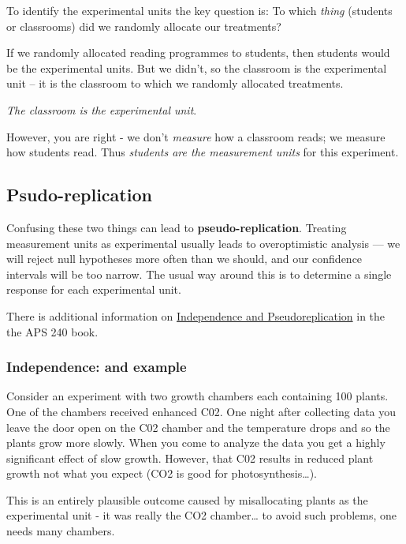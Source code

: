 \documentclass[
]{book}
\begin{document}
To identify the experimental units the key question is: To which \emph{thing} (students or classrooms) did we randomly allocate our treatments?

If we randomly allocated reading programmes to students, then students would be the experimental units. But we didn't, so the classroom is the experimental unit -- it is the classroom to which we randomly allocated treatments.

\emph{The classroom is the experimental unit}.

However, you are right - we don't \emph{measure} how a classroom reads; we measure how students read. Thus \emph{students are the measurement units} for this experiment.

\hypertarget{psudo-replication}{%
\subsection{Psudo-replication}\label{psudo-replication}}

Confusing these two things can lead to \textbf{pseudo-replication}. Treating measurement units as experimental usually leads to overoptimistic analysis --- we will reject null hypotheses more often than we should, and our confidence intervals will be too narrow. The usual way around this is to determine a single response for each experimental unit.

There is additional information on \href{https://dzchilds.github.io/stats-for-bio/principles-experimental-design.html\#independence}{Independence and Pseudoreplication} in the the APS 240 book.

\hypertarget{independence-and-example}{%
\subsubsection{Independence: and example}\label{independence-and-example}}

Consider an experiment with two growth chambers each containing 100 plants. One of the chambers received enhanced C02. One night after collecting data you leave the door open on the C02 chamber and the temperature drops and so the plants grow more slowly. When you come to analyze the data you get a highly significant effect of slow growth. However, that C02 results in reduced plant growth not what you expect (CO2 is good for photosynthesis\ldots).

This is an entirely plausible outcome caused by misallocating plants as the experimental unit - it was really the CO2 chamber\ldots{} to avoid such problems, one needs many chambers.
\end{document}
